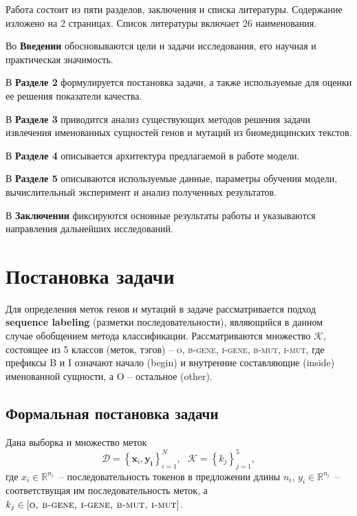 \documentclass[12pt, a4paper]{article} %
\begin{document}
\bigskip

Работа состоит из пяти разделов, заключения и списка литературы. Содержание изложено на 2 страницах. Список литературы включает 26 наименования.

Во \textbf{Введении} обосновываются цели и задачи исследования, его научная и практическая значимость.

В \textbf{Разделе 2} формулируется постановка задачи, а также используемые для оценки ее решения показатели качества.

В \textbf{Разделе 3} приводится анализ существующих методов решения задачи извлечения именованных сущностей генов и мутаций из биомедицинских текстов.

В \textbf{Разделе 4} описывается архитектура предлагаемой в работе модели.

В \textbf{Разделе 5} описываются используемые данные, параметры обучения модели, вычислительный эксперимент и анализ полученных результатов.

В \textbf{Заключении} фиксируются основные результаты работы и указываются направления дальнейших исследований.





\newpage
\section{Постановка задачи}
Для определения меток генов и мутаций в задаче рассматривается подход \textbf{sequence labeling} (разметки последовательности), являющийся в данном случае обобщением метода классификации. Рассматриваются множество $\mathcal{K}$, состоящее из 5 классов (меток, тэгов) -- \textsc{o, b-gene, i-gene, b-mut, i-mut}, где префиксы B и I означают начало (begin) и внутренние составляющие (inside) именованной сущности, а O -- остальное (other).
\subsection{Формальная постановка задачи}


Дана выборка и множество меток $$\mathcal{D} = \left\{\mathbf{x}_i, \mathbf{{y}_i}\right\}_{i=1}^N, ~~~ \mathcal{K}=\left\{\mathit{{k}_j}\right\}_{j=1}^5,$$ где $\mathit{x}_i\in \mathbb{R}^{n_i}$~-- последовательность токенов в предложении длины $\mathit{n}_i$, ${y}_i \in \mathbb{R}^{n_i}$~-- соответствущая им последовательность меток, а $k_j\in \left[\textsc{o, b-gene, i-gene, b-mut, i-mut}\right]$.
\end{document}
